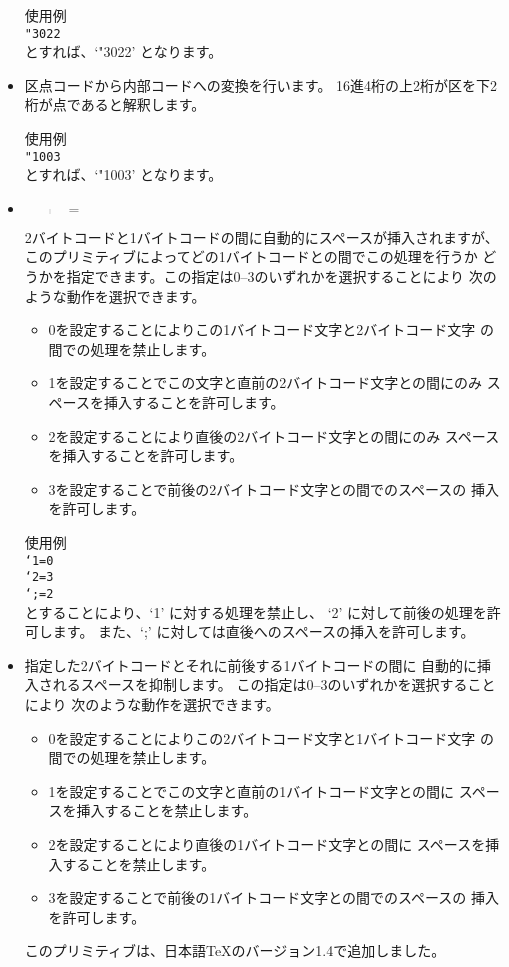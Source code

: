 \begin{itemize}
	\noindent
	使用例\\
	{\tt{}"3022}\\
	とすれば、`\char\jis"3022' となります。
\item {}
	\begin{quote}
	\end{quote}
	区点コードから内部コードへの変換を行います。
	16進4桁の上2桁が区を下2桁が点であると解釈します。

	\noindent
	使用例\\
	{\tt{}"1003}\\
	とすれば、`\char\kuten"1003' となります。
\item {}
	\begin{quote}
	$=$
	\end{quote}
	2バイトコードと1バイトコードの間に自動的にスペースが挿入されますが、
	このプリミティブによってどの1バイトコードとの間でこの処理を行うか
	どうかを指定できます。この指定は0--3のいずれかを選択することにより
	次のような動作を選択できます。
	\begin{itemize}
	\item 0を設定することによりこの1バイトコード文字と2バイトコード文字
		の間での処理を禁止します。
	\item 1を設定することでこの文字と直前の2バイトコード文字との間にのみ
		スペースを挿入することを許可します。
	\item 2を設定することにより直後の2バイトコード文字との間にのみ
		スペースを挿入することを許可します。
	\item 3を設定することで前後の2バイトコード文字との間でのスペースの
		挿入を許可します。
	\end{itemize}

	\noindent
	使用例\\
	{\tt{}`1=0\\
	`2=3\\
	`;=2}\\
	とすることにより、`1' に対する処理を禁止し、
	`2' に対して前後の処理を許可します。
	また、`;' に対しては直後へのスペースの挿入を許可します。
\item {}
	指定した2バイトコードとそれに前後する1バイトコードの間に
	自動的に挿入されるスペースを抑制します。
	この指定は0--3のいずれかを選択することにより
	次のような動作を選択できます。
	\begin{itemize}
	\item 0を設定することによりこの2バイトコード文字と1バイトコード文字
		の間での処理を禁止します。
	\item 1を設定することでこの文字と直前の1バイトコード文字との間に
		スペースを挿入することを禁止します。
	\item 2を設定することにより直後の1バイトコード文字との間に
		スペースを挿入することを禁止します。
	\item 3を設定することで前後の1バイトコード文字との間でのスペースの
		挿入を許可します。
	\end{itemize}
	このプリミティブは、日本語\TeX のバージョン1.4で追加しました。


\end{itemize}

